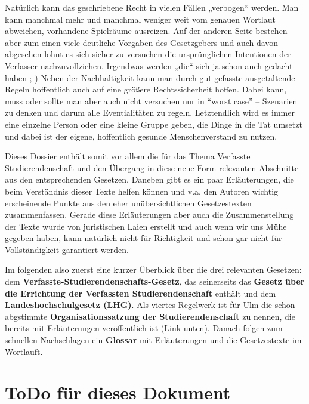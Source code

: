 \documentclass[
10pt,
a4paper,
twoside,								%
titlepage=false,							%
draft=false								%
]{scrartcl}
\begin{document}
Natürlich kann das geschriebene Recht in vielen Fällen „verbogen“ werden. Man kann manchmal mehr und manchmal weniger weit vom genauen Wortlaut abweichen, vorhandene Spielräume ausreizen. Auf der anderen Seite bestehen aber zum einen viele deutliche Vorgaben des Gesetzgebers und auch davon abgesehen lohnt es sich sicher zu versuchen die ursprünglichen Intentionen der Verfasser nachzuvollziehen. Irgendwas werden „die“ sich ja schon auch gedacht haben ;-) Neben der Nachhaltigkeit kann man durch gut gefasste ausgetaltende Regeln hoffentlich auch auf eine größere Rechtssicherheit hoffen. Dabei kann, muss oder sollte man aber auch nicht versuchen nur in “worst case” – Szenarien zu denken und darum alle Eventialitäten zu regeln. Letztendlich wird es immer eine einzelne Person oder eine kleine Gruppe geben, die Dinge in die Tat umsetzt und dabei ist der eigene, hoffentlich gesunde Menschenverstand zu nutzen.

Dieses Dossier enthält somit vor allem die für das Thema Verfasste Studierendenschaft und den Übergang in diese neue Form relevanten Abschnitte aus den entsprechenden Gesetzen. Daneben gibt es ein paar Erläuterungen, die beim Verständnis dieser Texte helfen können und v.a. den Autoren wichtig erscheinende Punkte aus den eher unübersichtlichen Gesetzestexten zusammenfassen. Gerade diese Erläuterungen aber auch die Zusammenstellung der Texte wurde von juristischen Laien erstellt und auch wenn wir uns Mühe gegeben haben, kann natürlich nicht für Richtigkeit und schon gar nicht für Vollständigkeit garantiert werden.

Im folgenden also zuerst eine kurzer Überblick über die drei relevanten Gesetzen: dem \textbf{Verfasste-Studierendenschafts-Gesetz}, das seinerseits das \textbf{Gesetz über die Errichtung der Verfassten Studierendenschaft} enthält und dem \textbf{Landeshochschulgesetz (LHG)}. 
Als viertes Regelwerk ist für Ulm die schon abgstimmte \textbf{Organisationssatzung der Studierendenschaft} zu nennen, die bereits mit Erläuterungen veröffentlich ist (Link unten). Danach folgen zum schnellen Nachschlagen ein \textbf{Glossar} mit Erläuterungen und die Gesetzestexte im Wortlauft.


\section*{ToDo für dieses Dokument}
\end{document}
